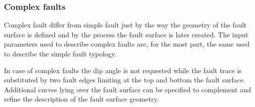 \subsubsection{Complex faults}
%
Complex fault differ from simple fault just by the way the geometry of 
the fault surface is defined and by the process the fault surface is later 
created. 
The input parameters used to describe complex faults are, for the most 
part, the same used to describe the simple fault typology. 

In case of complex faults the dip angle is not requested while the fault
trace is substituted by two fault edges limiting at the top and bottom 
the fault surface. Additional curves lying over the fault surface can be 
specified to complement and refine the description of the fault surface 
geometry.

